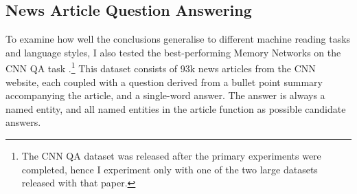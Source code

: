 \fi
	




\begin{table}[ht]
  \begin{center}
   \label{tab:qacnn_res}
    \resizebox{1\linewidth}{!}{
      {\sc 
        \begin{tabular}{l|cc}
          Methods & Validation & Test \\
          \hline
          \hline
          Maximum frequency (article)$^{(*)}$ & 0.305 & 0.332 \\
          Sliding window & 0.005 & 0.006 \\
          Word distance model$^{(*)}$ & 0.505 & 0.509 \\
          \hline 
          Deep LSTMs (article+query)$^{(*)}$ & 0.550 & 0.570 \\
          Contextual LSTMs (``Attentive reader'')$^{(*)}$ & 0.616 & 0.630 \\
          Contextual LSTMs (``Impatient reader'')$^{(*)}$ & 0.618 & 0.638 \\
          \hline
          MemNNs (window memory) & 0.580 & 0.606 \\
          MemNNs (window memory + self-sup.) & 0.634 & 0.668 \\
          \hline
          MemNNs (window memory + ensemble) & 0.612 & 0.638 \\ 
          MemNNs (window memory + self-sup.  + ensemble) & 0.649 & 0.684 \\
          \hline
          MemNNs (window  + self-sup.  +  ensemble + exclud. coocurrences) & \bf 0.662 & \bf 0.694 \\
          \hline
        \end{tabular}
      }
    }
    \caption{\label{tab:qacnn_res} {\bf Results on CNN QA.} $^{(*)}$Results taken from \cite{nips15_hermann}.}\label{cnn}
  \end{center}
  \vspace*{-2ex}
\end{table}


\subsection{News Article Question Answering}
\label{dmind}
To examine how well the conclusions generalise to different machine
reading tasks and language styles, I also tested the
best-performing Memory Networks on the CNN QA task \citep{nips15_hermann}.\footnote{The CNN QA dataset was released after the primary experiments were completed, hence I experiment only with one of the two large datasets released with that paper.} This dataset consists of 93k news articles from the CNN website, each coupled with a question derived from a bullet point summary accompanying the article, and a single-word answer. The answer is always a named entity, and all named entities in the article function as possible candidate answers.

